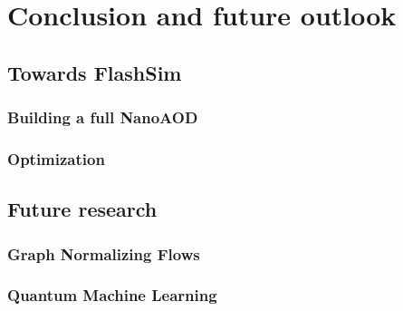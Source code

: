 \chapter{Conclusion and future outlook}\label{ch:outlook} %

\section{Towards FlashSim}

\subsection{Building a full NanoAOD}

\subsection{Optimization}

\section{Future research}

\subsection{Graph Normalizing Flows}

\subsection{Quantum Machine Learning}